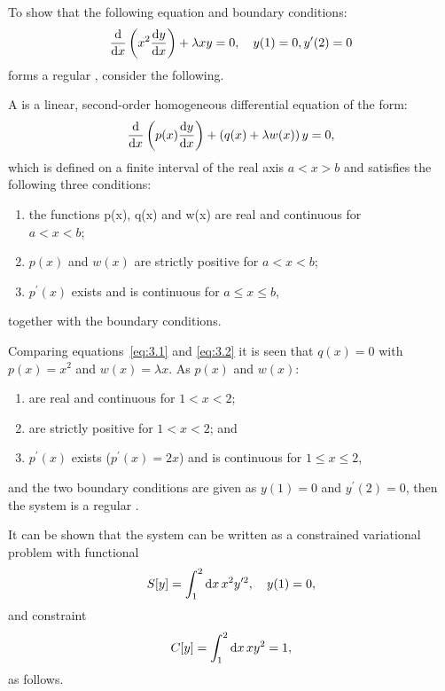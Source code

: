 To show that the following equation and boundary conditions:
\begin{equation}
\label{eq:3.1}
	\frac{\mathrm{d}}{\mathrm{d}x}\left(x^2\frac{\mathrm{d}y}{\mathrm{d}x}\right)+\lambda x y = 0,\quad y(1)=0, y^\prime(2)=0
\end{equation}
forms a regular \sls, consider the following.

A \sls is a linear, second-order homogeneous differential equation of the form:
\begin{equation}
\label{eq:3.2}
	\frac{\mathrm{d}}{\mathrm{d}x}\left(p(x)\frac{\mathrm{d}y}{\mathrm{d}x}\right) + \left(q(x) + \lambda w(x)\right) y=0,
\end{equation}
which is defined on a finite interval of the real axis $a<x>b$ and satisfies the following three conditions:
\begin{enumerate}
  \item 
  the functions p(x), q(x) and w(x) are real and continuous for\\ $a<x<b$;
  \item
  $p(x)$ and $w(x)$ are strictly positive for $a<x<b$;
  \item
  $p^\prime(x)$ exists and is continuous for $a\leq x\leq b$,
\end{enumerate}
together with the boundary conditions.

Comparing equations~\eqref{eq:3.1} and \eqref{eq:3.2} it is seen that $q(x)=0$ with $p(x) = x^2$ and $w(x)=\lambda x$. As $p(x)$ and $w(x)$:
\begin{enumerate}
\item
are real and continuous for $1<x<2$;
\item
are strictly positive for $1<x<2$; and
\item
$p^\prime(x)$ exists ($p^\prime(x) = 2x$) and is continuous for $1\leq x\leq 2$,
\end{enumerate}
and the two boundary conditions are given as $y(1)=0$ and $y^\prime(2)=0$, then the system is a regular \sls.

It can be shown that the system can be written as a constrained variational problem with functional
\begin{equation}
	\label{eq:3.3}
	S[y] = \int_{1}^{2}\mathrm{d} x\, x^2 y^{\prime 2},\quad y(1) = 0,
\end{equation}
and constraint
\begin{equation}
	\label{eq:3.4}
	C[y] = \int_{1}^{2}\mathrm{d} x\, x y^2 = 1,
\end{equation}
as follows.

